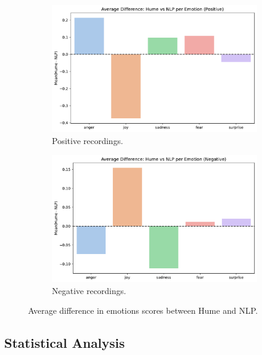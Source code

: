 \begin{figure}[!h]
    \centering 
    \begin{subfigure}[b]{0.49\textwidth}
        \includegraphics[width=\textwidth]{png/results/rq2/hume_nlp_difference_positive.pdf}
        \caption{Positive recordings.}
        \label{fig:rq2_avg_diff_pos}
    \end{subfigure}
    \begin{subfigure}[b]{0.49\textwidth}
    \includegraphics[width=\textwidth]{png/results/rq2/hume_nlp_difference_negative.pdf}
    \caption{Negative recordings.}
    \label{fig:rq2_avg_diff_neg}
    \end{subfigure}
    \caption{Average difference in emotions scores between Hume and NLP.}
    \label{fig:rq2_avg_diff_full}
\end{figure}

\newpage
\subsection{Statistical Analysis}
